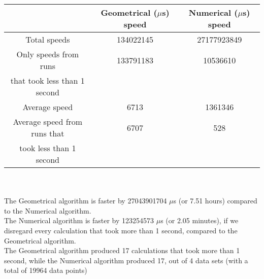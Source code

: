 \begin{tabular}[3]{c|c|c}
 & Geometrical ($\mu$s) speed & Numerical ($\mu$s) speed\\
\hline
Total speeds & 134022145 & 27177923849 \\ 
\hline 
Only speeds from runs & 133791183 & 10536610 \\ 
that took less than 1 second & & \\ 
\hline
Average speed & 6713 & 1361346 \\
\hline
Average speed from runs that & 6707 & 528 \\ 
took less than 1 second & & \\ 
\end{tabular}\\ \\
The Geometrical algorithm is faster by 27043901704 $\mu$s (or 7.51 hours) compared to the Numerical algorithm.\\
The Numerical algorithm is faster by 123254573 $\mu$s (or 2.05 minutes), if we disregard every calculation that took more than 1 second, compared to the Geometrical algorithm.\\
The Geometrical algorithm produced 17 calculations that took more than 1 second, while the Numerical algorithm produced 17, out of 4 data sets (with a total of 19964 data points)\\
